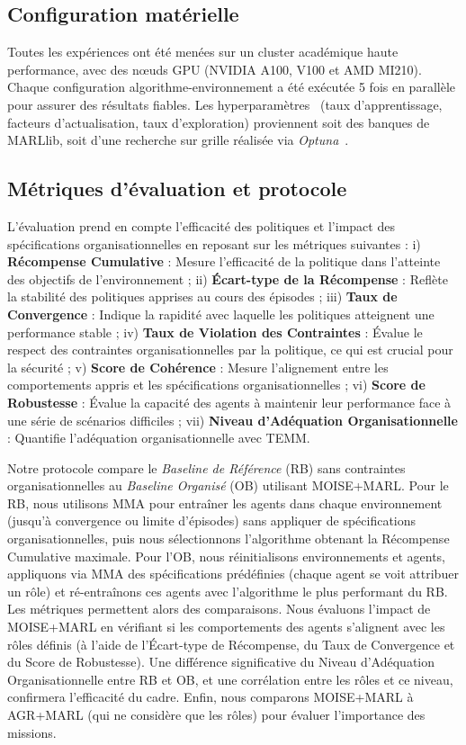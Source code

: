 \documentclass[francais,ROIA,Unicode,manuscript]{cedram}
\begin{document}
\subsection{Configuration matérielle}

Toutes les expériences ont été menées sur un cluster académique haute performance, avec des nœuds GPU (NVIDIA A100, V100 et AMD MI210). Chaque configuration algorithme-environnement a été exécutée 5 fois en parallèle pour assurer des résultats fiables.
Les hyperparamètres~\hyperref[fn:github]{\footnotemark[1]} (taux d'apprentissage, facteurs d'actualisation, taux d'exploration) proviennent soit des banques de MARLlib, soit d’une recherche sur grille réalisée via \textit{Optuna}~\cite{akiba2019optuna}.

\subsection{Métriques d'évaluation et protocole}

L'évaluation prend en compte l'efficacité des politiques et l'impact des spécifications organisationnelles en reposant sur les métriques suivantes :
%
i) \textbf{Récompense Cumulative} : Mesure l'efficacité de la politique dans l'atteinte des objectifs de l'environnement
; \quad
ii) \textbf{Écart-type de la Récompense} : Reflète la stabilité des politiques apprises au cours des épisodes
; \quad
iii) \textbf{Taux de Convergence} : Indique la rapidité avec laquelle les politiques atteignent une performance stable
; \quad
iv) \textbf{Taux de Violation des Contraintes} : Évalue le respect des contraintes organisationnelles par la politique, ce qui est crucial pour la sécurité
; \quad
v) \textbf{Score de Cohérence} : Mesure l'alignement entre les comportements appris et les spécifications organisationnelles
; \quad
vi) \textbf{Score de Robustesse} : Évalue la capacité des agents à maintenir leur performance face à une série de scénarios difficiles
; \quad
vii) \textbf{Niveau d'Adéquation Organisationnelle} : Quantifie l'adéquation organisationnelle avec TEMM.

Notre protocole compare le \textit{Baseline de Référence} (RB) sans contraintes organisationnelles au \textit{Baseline Organisé} (OB) utilisant MOISE+MARL.
Pour le RB, nous utilisons MMA pour entraîner les agents dans chaque environnement (jusqu'à convergence ou limite d'épisodes) sans appliquer de spécifications organisationnelles, puis nous sélectionnons l'algorithme obtenant la Récompense Cumulative maximale.
Pour l'OB, nous réinitialisons environnements et agents, appliquons via MMA des spécifications prédéfinies (chaque agent se voit attribuer un rôle) et ré-entraînons ces agents avec l'algorithme le plus performant du RB. Les métriques permettent alors des comparaisons.
%
Nous évaluons l'impact de MOISE+MARL en vérifiant si les comportements des agents s'alignent avec les rôles définis (à l'aide de l'Écart-type de Récompense, du Taux de Convergence et du Score de Robustesse). Une différence significative du Niveau d'Adéquation Organisationnelle entre RB et OB, et une corrélation entre les rôles et ce niveau, confirmera l'efficacité du cadre.
Enfin, nous comparons MOISE+MARL à AGR+MARL (qui ne considère que les rôles) pour évaluer l'importance des missions.
\end{document}
